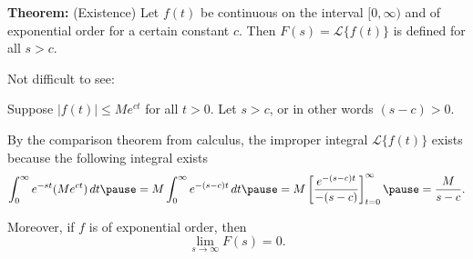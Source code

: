 \documentclass[10pt,aspectratio=169]{beamer}
\begin{document}
\begin{frame}

\textbf{Theorem:} (Existence)
Let $f(t)$ be continuous on the interval $[0,\infty)$ and of exponential order for a certain
constant $c$.  Then $F(s) = \mathcal{L} \bigl\{ f(t) \bigr\}$ is defined for
all $s > c$.

\medskip
\pause

Not difficult to see:

Suppose
$\lvert f(t) \rvert \leq M e^{ct}$ for all $t > 0$.
Let $s > c$, or in other words $(s-c) > 0$.

\medskip
\pause

By the comparison theorem from calculus, the improper integral
$\mathcal{L} \bigl\{ f(t) \bigr\}$ exists because the following integral exists
\begin{equation*}
\int_0^\infty e^{-st} ( M e^{ct} ) \,dt
\pause
=
M \int_0^\infty e^{-(s-c)t} \,dt
\pause
= M \left[ \frac{e^{-(s-c)t}}{-(s-c)}
\right]_{t=0}^\infty
\pause
= \frac{M}{s-c} .
\end{equation*}
\pause

Moreover,
if $f$ is of exponential order, then
\begin{equation*}
\lim_{s\to\infty} F(s) = 0 .
\end{equation*}
\end{frame}
\end{document}
